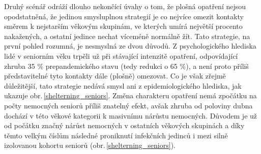 Druhý scénář odráží dlouho nekončící úvahy o tom, že plošná opatření nejsou opodstatněná, že jedinou smysluplnou strategií je co nejvíce omezit kontakty směrem k nejstarším věkovým skupinám, ve kterých umírá největší procento nakažených, a ostatní jedince nechat víceméně normálně žít. Tato strategie, na první pohled rozumná, je nesmyslná ze dvou důvodů. Z psychologického hlediska lidé v seniorním věku trpěli už při stávající intenzitě opatření, odpovídající zhruba 35 \% prepandemického stavu (tedy redukci o 65 \%), a není proto příliš představitelné tyto kontakty dále (plošně) omezovat. Co je však zřejmě důležitější, tato strategie nedává smysl ani z epidemiologického hlediska, jak ukazuje obr.\,\ref{shelterning_seniors}. Změna charakteru opatření nemá zpočátku na počty nemocných seniorů příliš znatelný efekt, avšak zhruba od poloviny dubna dochází v této věkové kategorii k masivnímu nárůstu nemocných. Důvodem je už od počátku značný nárůst nemocných v ostatních věkových skupinách a díky těmto velkým číslům následné proniknutí infekčních jedinců i mezi silně izolovanou kohortu seniorů (obr.\,\ref{shelterning_seniors}).

